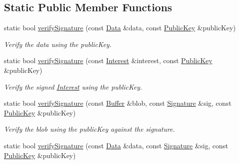 \subsection*{Static Public Member Functions}
\begin{DoxyCompactItemize}
\item 
static bool \hyperlink{classndn_1_1Validator_a0415f0aa2894fceb58dbddd9c1677b5f}{verify\+Signature} (const \hyperlink{classndn_1_1Data}{Data} \&data, const \hyperlink{classndn_1_1PublicKey}{Public\+Key} \&public\+Key)\hypertarget{classndn_1_1Validator_a0415f0aa2894fceb58dbddd9c1677b5f}{}\label{classndn_1_1Validator_a0415f0aa2894fceb58dbddd9c1677b5f}

\begin{DoxyCompactList}\small\item\em Verify the data using the public\+Key. \end{DoxyCompactList}\item 
static bool \hyperlink{classndn_1_1Validator_a193e3f5844c7bfb786837ebf7d5ac6f7}{verify\+Signature} (const \hyperlink{classndn_1_1Interest}{Interest} \&interest, const \hyperlink{classndn_1_1PublicKey}{Public\+Key} \&public\+Key)
\begin{DoxyCompactList}\small\item\em Verify the signed \hyperlink{classndn_1_1Interest}{Interest} using the public\+Key. \end{DoxyCompactList}\item 
static bool \hyperlink{classndn_1_1Validator_aa7c9ffb0d265883b469533eef8ebf4ee}{verify\+Signature} (const \hyperlink{classndn_1_1Buffer}{Buffer} \&blob, const \hyperlink{classndn_1_1Signature}{Signature} \&sig, const \hyperlink{classndn_1_1PublicKey}{Public\+Key} \&public\+Key)\hypertarget{classndn_1_1Validator_aa7c9ffb0d265883b469533eef8ebf4ee}{}\label{classndn_1_1Validator_aa7c9ffb0d265883b469533eef8ebf4ee}

\begin{DoxyCompactList}\small\item\em Verify the blob using the public\+Key against the signature. \end{DoxyCompactList}\item 
static bool \hyperlink{classndn_1_1Validator_a7d4df84ebd841d12617c6b7756068354}{verify\+Signature} (const \hyperlink{classndn_1_1Data}{Data} \&data, const \hyperlink{classndn_1_1Signature}{Signature} \&sig, const \hyperlink{classndn_1_1PublicKey}{Public\+Key} \&public\+Key)\hypertarget{classndn_1_1Validator_a7d4df84ebd841d12617c6b7756068354}{}\label{classndn_1_1Validator_a7d4df84ebd841d12617c6b7756068354}


\end{DoxyCompactItemize}
